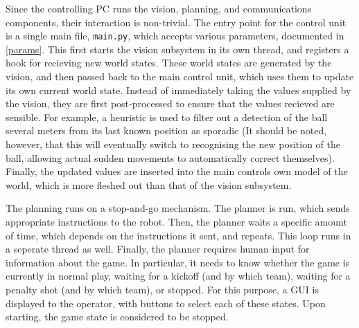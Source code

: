 Since the controlling PC runs the vision, planning, and communications
components, their interaction is non-trivial. The entry point for the control
unit is a single main file, \texttt{main.py}, which accepts various parameters,
documented in \cref{params}. This first starts the vision subsystem in its own
thread, and registers a hook for recieving new world states. These world states
are generated by the vision, and then passed back to the main control unit,
which uses them to update its own current world state. Instead of immediately
taking the values supplied by the vision, they are first post-processed to
ensure that the values recieved are sensible. For example, a heuristic is used
to filter out a detection of the ball several meters from its last known
position as sporadic (It should be noted, however, that this will eventually
switch to recognising the new position of the ball, allowing actual sudden
movements to automatically correct themselves). Finally, the updated values are
inserted into the main controls own model of the world, which is more fleshed
out than that of the vision subsystem.

The planning runs on a stop-and-go mechanism. The planner is run, which sends 
appropriate instructions to the robot. Then, the planner waits a specific
amount of time, which depends on the instructions it sent, and repeats. This
loop runs in a seperate thread as well. Finally, the planner requires human
input for information about the game. In particular, it needs to know whether
the game is currently in normal play, waiting for a kickoff (and by which
team), waiting for a penalty shot (and by which team), or stopped. For this
purpose, a GUI is displayed to the operator, with buttons to select each of
these states. Upon starting, the game state is considered to be stopped.
